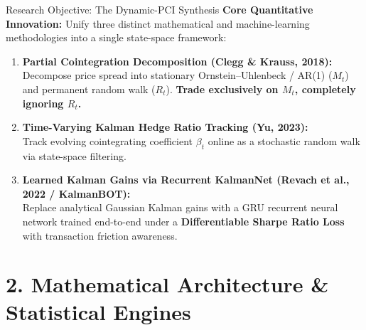 \documentclass[10pt, aspectratio=169]{beamer}
\begin{document}
\begin{frame}{Research Objective: The Dynamic-PCI Synthesis}
  \textbf{Core Quantitative Innovation:}
  Unify three distinct mathematical and machine-learning methodologies into a single state-space framework:
  \vspace{6pt}
  \begin{enumerate}
    \item \textbf{Partial Cointegration Decomposition (Clegg \& Krauss, 2018):}\\
          Decompose price spread into stationary Ornstein--Uhlenbeck / AR(1) ($M_t$) and permanent random walk ($R_t$). \textbf{Trade exclusively on $M_t$, completely ignoring $R_t$.}
    \item \textbf{Time-Varying Kalman Hedge Ratio Tracking (Yu, 2023):}\\
          Track evolving cointegrating coefficient $\beta_t$ online as a stochastic random walk via state-space filtering.
    \item \textbf{Learned Kalman Gains via Recurrent KalmanNet (Revach et al., 2022 / KalmanBOT):}\\
          Replace analytical Gaussian Kalman gains with a GRU recurrent neural network trained end-to-end under a \textbf{Differentiable Sharpe Ratio Loss} with transaction friction awareness.
  \end{enumerate}
\end{frame}

\section{2. Mathematical Architecture \& Statistical Engines}
\end{document}
